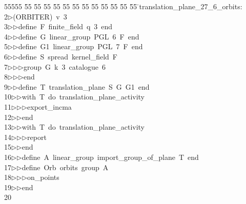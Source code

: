 %
%
\begin{tabbing}
55555 \= 55 \= 55 \= 55 \= 55 \= 55 \= 55 \= 55 \= 55 \= 55 \= 55 \= 55 \= 55 \= \>translation\_plane\_27\_6\_orbits:\\[0pt]
2\>$\triangleright$\>(ORBITER)\ v\ 3\ \\[0pt]
3\>$\triangleright$\>$\triangleright$\>define\ F\ finite\_field\ q\ 3\ end\ \\[0pt]
4\>$\triangleright$\>$\triangleright$\>define\ G\ linear\_group\ PGL\ 6\ F\ end\ \\[0pt]
5\>$\triangleright$\>$\triangleright$\>define\ G1\ linear\_group\ PGL\ 7\ F\ end\ \\[0pt]
6\>$\triangleright$\>$\triangleright$\>define\ S\ spread\ kernel\_field\ F\ \\[0pt]
7\>$\triangleright$\>$\triangleright$\>$\triangleright$\>group\ G\ k\ 3\ catalogue\ 6\ \\[0pt]
8\>$\triangleright$\>$\triangleright$\>$\triangleright$\>end\ \\[0pt]
9\>$\triangleright$\>$\triangleright$\>define\ T\ translation\_plane\ S\ G\ G1\ end\ \\[0pt]
10\>$\triangleright$\>$\triangleright$\>with\ T\ do\ translation\_plane\_activity\ \\[0pt]
11\>$\triangleright$\>$\triangleright$\>$\triangleright$\>export\_incma\ \\[0pt]
12\>$\triangleright$\>$\triangleright$\>end\ \\[0pt]
13\>$\triangleright$\>$\triangleright$\>with\ T\ do\ translation\_plane\_activity\ \\[0pt]
14\>$\triangleright$\>$\triangleright$\>$\triangleright$\>report\ \\[0pt]
15\>$\triangleright$\>$\triangleright$\>end\ \\[0pt]
16\>$\triangleright$\>$\triangleright$\>define\ A\ linear\_group\ import\_group\_of\_plane\ T\ end\ \\[0pt]
17\>$\triangleright$\>$\triangleright$\>define\ Orb\ orbits\ group\ A\ \\[0pt]
18\>$\triangleright$\>$\triangleright$\>$\triangleright$\>on\_points\ \\[0pt]
19\>$\triangleright$\>$\triangleright$\>end\\[0pt]
20\>\end{tabbing}
